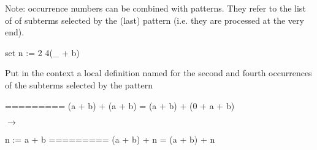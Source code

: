 \begin{landscape}
\begin{small}
\begin{multicols*}{3}[\begin{center}\section*{}\end{center}]
Note: occurrence numbers can be combined with patterns. They refer
to the list of of subterms selected by the (last) pattern (i.e. they
are processed at the very end).

\begin{cheat}
set n := {2 4}(_ + b)
\end{cheat}
  Put in the context a local definition named  for the
  second and fourth occurrences of the subterms selected by the
  pattern 

\begin{cheatout}
=========
(a + b) + (a + b) =
 (a + b) + (0 + a + b)
\end{cheatout}
$\to$
\begin{cheatout}
 n := a + b
=========
(a + b) + n =
  (a + b) + n
\end{cheatout}


\end{multicols*}

\end{small}
\end{landscape}
\restoregeometry
